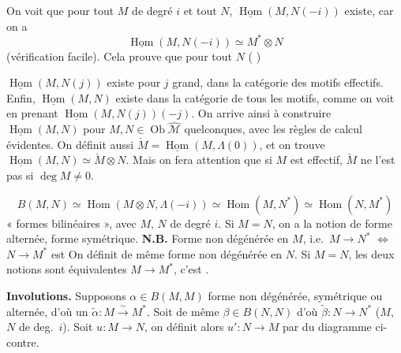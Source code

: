 \documentclass[11pt,a4paper]{article}
\begin{document}
On voit que pour tout $M$ de degré $i$ et tout $N$,
$\underline{\operatorname{Hom}}(M, N(-i))$ existe, car on a
\[
  \underline{\operatorname{Hom}}(M, N(-i)) \simeq M^{*} \otimes N
\]
(vérification facile).  Cela prouve que pour tout $N$ (
 )

$\underline{\operatorname{Hom}}(M, N(j))$ existe pour $j$ grand, dans la
catégorie des motifs effectifs. Enfin, $\underline{\operatorname{Hom}}(M,N)$
existe dans la catégorie de tous les motifs, comme on voit en prenant
$\underline{\operatorname{Hom}}(M, N(j))(-j)$. On arrive ainsi à construire
$\underline{\operatorname{Hom}}(M,N)$ pour $M, N \in
\operatorname{Ob}\widehat{\mathcal{M}}$ quelconques, avec les règles de calcul
évidentes. On définit aussi
$\check{M} = \underline{\operatorname{Hom}}(M, \Lambda(0))$, et on trouve
$\underline{\operatorname{Hom}}(M,N) \simeq \check{M} \otimes N$. Mais on fera
attention que si $M$ est effectif, $\check{M}$ ne l'est pas si
$\deg M \neq 0$.

\[
  B(M,N) \simeq \operatorname{Hom}(M \otimes N, \Lambda(-i)) \simeq
  \operatorname{Hom}(M, N^{*}) \simeq \operatorname{Hom}(N, M^{*})
\]
« formes bilinéaires », avec $M$, $N$ de degré $i$.
Si $M = N$, on a la notion de forme alternée, forme symétrique.
\textbf{N.B.} Forme non dégénérée en $M$, i.e.\ $M \to N^{*}$ 
$\Longleftrightarrow$ $N \to M^{*}$ est  
On définit de même forme non dégénérée en $N$.
Si $M = N$, les deux notions sont équivalentes  \struck{\ill{}}
   $M \to M^{*}$,
  c'est  
 \ill{}    \ill{}
\uncertain{(\ill{})}.

\textbf{Involutions.} Supposons $\alpha \in B(M,M)$  forme non dégénérée, symétrique ou \struck{\ill{}}
alternée, d'où  un 
$\widetilde{\alpha} \colon M \xrightarrow{\sim} M^{*}$. Soit de même
$\beta \in B(N,N)$ d'où $\widetilde{\beta} \colon N \to N^{*}$
($M$, $N$ de deg.\ $i$). Soit $u \colon M \to N$, on définit alors
$u' \colon N \to M$ par  du diagramme ci-contre.
\end{document}
